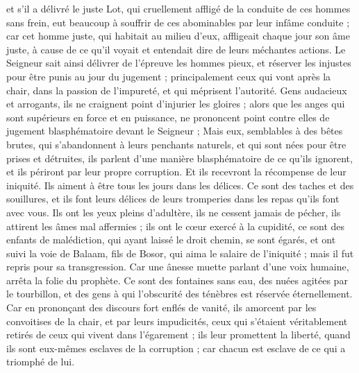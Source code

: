 \begin{multicols}{2}
et s'il a délivré le juste Lot{}, qui cruellement affligé de la conduite de ces hommes sans frein, eut beaucoup à souffrir de ces abominables par leur infâme conduite ;
car cet homme juste, qui habitait au milieu d’eux, affligeait chaque jour son âme juste, à cause de ce qu’il voyait et entendait dire de leurs méchantes actions.
Le Seigneur sait ainsi délivrer de l’épreuve les hommes pieux, et réserver les injustes pour être punis au jour du jugement ;
principalement ceux qui vont après la chair, dans la passion de l'impureté, et qui méprisent l’autorité. Gens audacieux et arrogants, ils ne craignent point d’injurier les gloires ;
alors que les anges qui sont supérieurs en force et en puissance, ne prononcent point contre elles de jugement blasphématoire devant le Seigneur ;
Mais eux, semblables à des bêtes brutes, qui s’abandonnent à leurs penchants naturels, et qui sont nées pour être prises et détruites, ils parlent d’une manière blasphématoire de ce qu’ils ignorent, et ils périront par leur propre corruption.
Et ils recevront la récompense de leur iniquité. Ils aiment à être tous les jours dans les délices. Ce sont des taches et des souillures, et ils font leurs délices de leurs tromperies dans les repas qu'ils font avec vous.
Ils ont les yeux pleins d'adultère, ils ne cessent jamais de pécher, ils attirent les âmes mal affermies ; ils ont le cœur exercé à la cupidité, ce sont des enfants de malédiction,
qui ayant laissé le droit chemin, se sont égarés, et ont suivi la voie de Balaam{}, fils de Bosor, qui aima le salaire de l'iniquité ; mais il fut repris pour sa transgression.
Car une ânesse muette parlant d'une voix humaine, arrêta la folie du prophète.
Ce sont des fontaines sans eau, des nuées agitées par le tourbillon, et des gens à qui l'obscurité des ténèbres est réservée éternellement.
Car en prononçant des discours fort enflés de vanité, ils amorcent par les convoitises de la chair, et par leurs impudicités, ceux qui s'étaient véritablement retirés de ceux qui vivent dans l’égarement ;
ils leur promettent la liberté, quand ils sont eux-mêmes esclaves de la corruption ; car chacun est esclave de ce qui a triomphé de lui.

\end{multicols}
